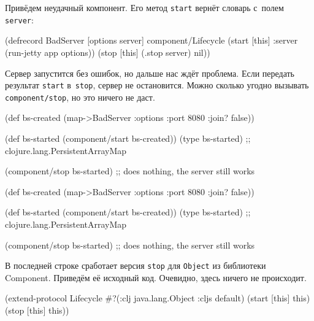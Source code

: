 Привёдем неудачный компонент. Его метод \verb|start| вернёт словарь с~полем
\verb|server|:

\begin{english}
  \begin{clojure}
(defrecord BadServer [options server]
  component/Lifecycle
  (start [this]
    {:server (run-jetty app options)})
  (stop [this]
    (.stop server)
    nil))
  \end{clojure}
\end{english}

Сервер запустится без ошибок, но дальше нас ждёт проблема. Если передать
результат \verb|start| в~\verb|stop|, сервер не остановится. Можно сколько
угодно вызывать \verb|component/stop|, но это ничего не даст.

\ifx\DEVICETYPE\MOBILE

\begin{english}
  \begin{clojure}
(def bs-created
  (map->BadServer
    {:options {:port 8080
               :join? false}}))

(def bs-started
   (component/start bs-created))
(type bs-started)
;; clojure.lang.PersistentArrayMap

(component/stop bs-started)
;; does nothing, the server still works
  \end{clojure}
\end{english}

\else

\begin{english}
  \begin{clojure}
(def bs-created (map->BadServer
                  {:options {:port 8080 :join? false}}))

(def bs-started (component/start bs-created))
(type bs-started)
;; clojure.lang.PersistentArrayMap

(component/stop bs-started)
;; does nothing, the server still works
  \end{clojure}
\end{english}

\fi

В последней строке сработает версия \verb|stop| для \verb|Object| из библиотеки
Component. Приведём её исходный код. Очевидно, здесь ничего не происходит.

\begin{english}
  \begin{clojure}
(extend-protocol Lifecycle
  #?(:clj java.lang.Object :cljs default)
  (start [this]
    this)
  (stop [this]
    this))
  \end{clojure}
\end{english}

